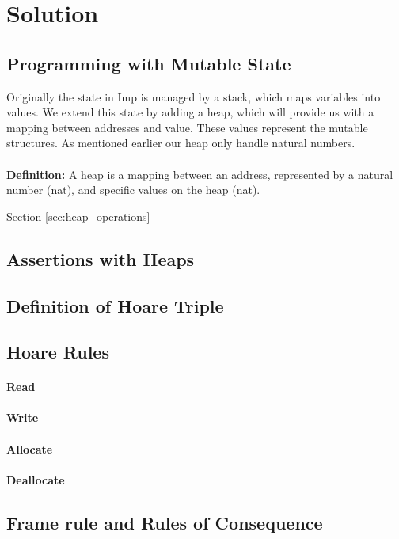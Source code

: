 \section{Solution}
\subsection{Programming with Mutable State}
Originally the state in Imp is managed by a stack, which maps variables into values. We extend this state by adding a heap, which will provide us with a mapping between addresses and value. These values represent the mutable structures. As mentioned earlier our heap only handle natural numbers.

\paragraph{}\textbf{Definition: }A heap is a mapping between an address, represented by a natural number (nat), and specific values on the heap (nat).

\begin{center}

\end{center}

Section \ref{sec:heap_operations}

\subsection{Assertions with Heaps}

\subsection{Definition of Hoare Triple}

\subsection{Hoare Rules}
\paragraph{Read}
\paragraph{Write}
\paragraph{Allocate}
\paragraph{Deallocate}
\subsection{Frame rule and Rules of Consequence}
